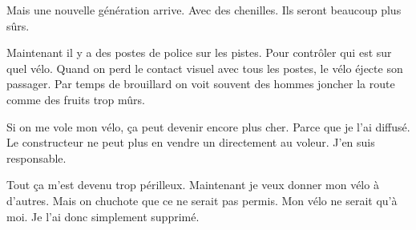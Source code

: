 Mais une nouvelle génération arrive. Avec des chenilles. Ils seront beaucoup plus sûrs.

Maintenant il y a des postes de police sur les pistes. Pour contrôler qui est sur quel vélo. Quand on perd le contact visuel avec tous les postes, le vélo éjecte son passager. Par temps de
brouillard on voit souvent des hommes joncher la route comme des fruits trop mûrs.

Si on me vole mon vélo, ça peut devenir encore plus cher. Parce que je l’ai diffusé. Le constructeur ne peut plus en vendre un directement au voleur. J’en suis responsable.

Tout ça m’est devenu trop périlleux. Maintenant je veux donner mon vélo à d’autres. Mais on chuchote que ce ne serait pas permis. Mon vélo ne serait qu’à moi. Je l’ai donc simplement
supprimé.
